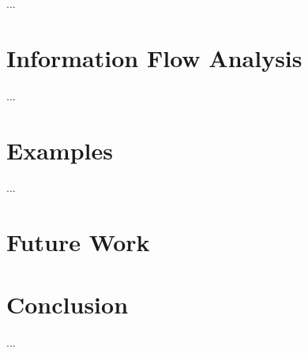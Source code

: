 \documentclass[10pt, conference]{IEEEtran}
\begin{document}
...

\section{Information Flow Analysis}
...
\section{Examples}
...

\section{Future Work}

\section{Conclusion}
...



\end{document}
